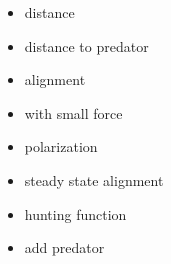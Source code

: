 \documentclass[12pt]{article}
\begin{document}
\singlespacing
\begin{itemize}

\item{\large distance}

\vspace{1cm}

\item{\large distance to predator}

\vspace{1cm}

\item{\large alignment}

\vspace{1cm}


\item{\large with small force}

\vspace{1cm}

\item{\large polarization}

\vspace{1cm}


\item{\large steady state alignment}

\vspace{1cm}


\item{\large hunting function}

\vspace{1cm}


\item{\large add predator}

\vspace{1cm}


\end{itemize}
\end{document}
